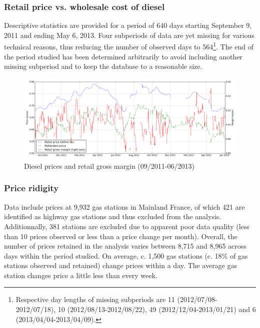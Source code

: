 \documentclass[11pt]{article}
\begin{document}
\subsubsection{Retail price vs. wholesale cost of diesel}

Descriptive statistics are provided for a period of 640 days starting September 9, 2011 and ending May 6, 2013. Four subperiods of data are yet missing for various technical reasons, thus reducing the number of observed days to 564\footnote{Respective day lengths of missing subperiods are 11 (2012/07/08-2012/07/18), 10 (2012/08/13-2012/08/22), 49 (2012/12/04-2013/01/21) and 6 (2013/04/04-2013/04/09).}. The end of the period studied has been determined arbitrarily to avoid including another missing subperiod and to keep the database to a reasonable size.

\begin{figure}[!h]
    \caption{Diesel prices and retail gross margin (09/2011-06/2013)}
	\centering
		\includegraphics[width=16cm]{graphs/diesel_price_margin.png}
\end{figure}

\subsubsection{Price ridigity}

Data include prices at 9,932 gas stations in Mainland France, of which 421 are identified as highway gas stations and thus excluded from the analysis. Additionnally, 381 stations are excluded due to apparent poor data quality (less than 10 prices observed or less than a price change per month). Overall, the number of prices retained in the analysis varies between 8,715 and 8,965 across days within the period studied. On average, c. 1,500 gas stations (c. 18\% of gas stations observed and retained) change prices within a day. The average gas station changes price a little less than every week.
\end{document}
